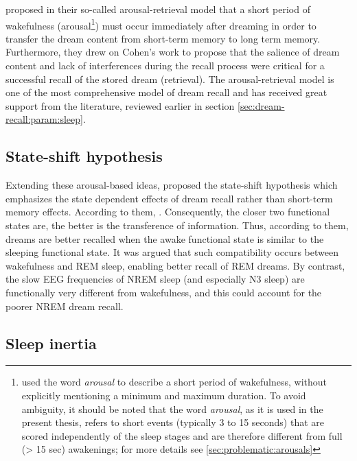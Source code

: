 \citet{koulack_dream_1976} proposed in their so-called arousal-retrieval model that a short period of wakefulness (arousal\footnote{\citet{koulack_dream_1976} used the word \emph{arousal} to describe a short period of wakefulness, without explicitly mentioning a minimum and maximum duration. To avoid ambiguity, it should be noted that the word \emph{arousal}, as it is used in the present thesis, refers to short events (typically 3 to 15 seconds) that are scored independently of the sleep stages and are therefore different from full (> 15 sec) awakenings; for more details see \ref{sec:problematic:arousals}}) must occur immediately after dreaming in order to transfer the dream content from short-term memory to long term memory. Furthermore, they drew on Cohen’s work to propose that the salience of dream content and lack of interferences during the recall process were critical for a successful recall of the stored dream (retrieval). The arousal-retrieval model is one of the most comprehensive model of dream recall and has received great support from the literature, reviewed earlier in section \ref{sec:dream-recall:param:sleep}.

\subsection{State-shift hypothesis}
\label{sec:dream-recall:theories:state}

Extending these arousal-based ideas, \citet{koukkou_dreaming:_1983} proposed the state-shift hypothesis which emphasizes the state dependent effects of dream recall rather than short-term memory effects. According to them,  \citep{koukkou_dreaming:_1983}. Consequently, the closer two functional states are, the better is the transference of information. Thus, according to them, dreams are better recalled when the awake functional state
is similar to the sleeping functional state. It was argued that such compatibility occurs between wakefulness and REM sleep, enabling better recall of REM dreams. By contrast, the slow EEG frequencies of NREM sleep (and especially N3 sleep) are functionally very different from wakefulness, and this could account for the poorer NREM dream recall.

\subsection{Sleep inertia}
\label{sec:dream-recall:theories:inertia}

